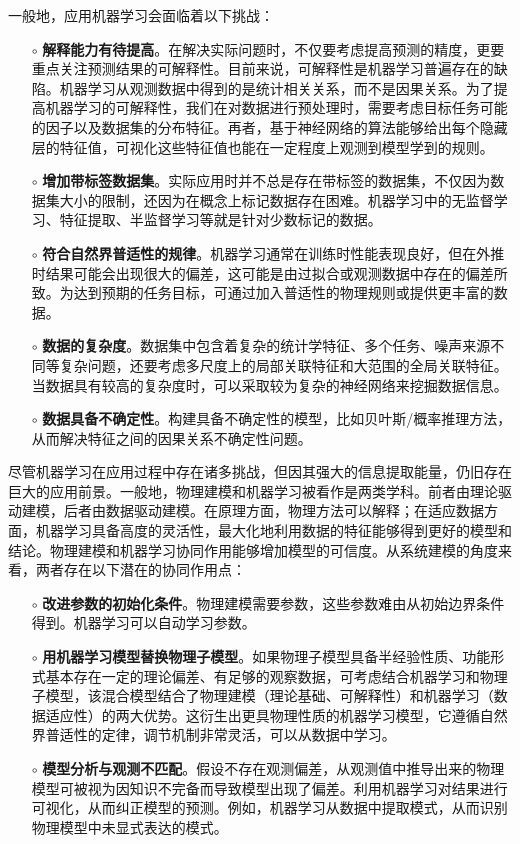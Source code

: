 一般地，应用机器学习会面临着以下挑战：
\begin{enumerate}
  \item[$\circ$] \textbf{解释能力有待提高}。在解决实际问题时，不仅要考虑提高预测的精度，更要重点关注预测结果的可解释性。目前来说，可解释性是机器学习普遍存在的缺陷\citep{montavon2018methods}。机器学习从观测数据中得到的是统计相关关系，而不是因果关系\citep{runge2015identifying,reichstein2019deep}。为了提高机器学习的可解释性，我们在对数据进行预处理时，需要考虑目标任务可能的因子以及数据集的分布特征。再者，基于神经网络的算法能够给出每个隐藏层的特征值，可视化这些特征值也能在一定程度上观测到模型学到的规则。
  \item[$\circ$] \textbf{增加带标签数据集}。实际应用时并不总是存在带标签的数据集，不仅因为数据集大小的限制，还因为在概念上标记数据存在困难。机器学习中的无监督学习、特征提取、半监督学习等就是针对少数标记的数据\citep{goodfellow2014generative}。
  \item[$\circ$] \textbf{符合自然界普适性的规律}。机器学习通常在训练时性能表现良好，但在外推时结果可能会出现很大的偏差，这可能是由过拟合或观测数据中存在的偏差所致\citep{friedlingstein2014uncertainties}。为达到预期的任务目标，可通过加入普适性的物理规则或提供更丰富的数据。
  \item[$\circ$] \textbf{数据的复杂度}。数据集中包含着复杂的统计学特征、多个任务、噪声来源不同等复杂问题，还要考虑多尺度上的局部关联特征和大范围的全局关联特征。当数据具有较高的复杂度时，可以采取较为复杂的神经网络来挖掘数据信息。
  \item[$\circ$] \textbf{数据具备不确定性}。构建具备不确定性的模型，比如贝叶斯/概率推理方法，从而解决特征之间的因果关系不确定性问题\citep{ghahramani2015probabilistic}。
\end{enumerate}

尽管机器学习在应用过程中存在诸多挑战，但因其强大的信息提取能量，仍旧存在巨大的应用前景。一般地，物理建模和机器学习被看作是两类学科。前者由理论驱动建模，后者由数据驱动建模。在原理方面，物理方法可以解释；在适应数据方面，机器学习具备高度的灵活性，最大化地利用数据的特征能够得到更好的模型和结论。物理建模和机器学习协同作用能够增加模型的可信度\citep{karpatne2017theory,camps2018physics,karpatne2017physics}。从系统建模的角度来看，两者存在以下潜在的协同作用点：
\begin{enumerate}
  \item[$\circ$] \textbf{改进参数的初始化条件}。物理建模需要参数，这些参数难由从初始边界条件得到。机器学习可以自动学习参数。
  \item[$\circ$] \textbf{用机器学习模型替换物理子模型}。如果物理子模型具备半经验性质、功能形式基本存在一定的理论偏差、有足够的观察数据，可考虑结合机器学习和物理子模型，该混合模型结合了物理建模（理论基础、可解释性）和机器学习（数据适应性）的两大优势。这衍生出更具物理性质的机器学习模型，它遵循自然界普适性的定律，调节机制非常灵活，可以从数据中学习。
  \item[$\circ$] \textbf{模型分析与观测不匹配}。假设不存在观测偏差，从观测值中推导出来的物理模型可被视为因知识不完备而导致模型出现了偏差。利用机器学习对结果进行可视化，从而纠正模型的预测。例如，机器学习从数据中提取模式，从而识别物理模型中未显式表达的模式。
\end{enumerate}

